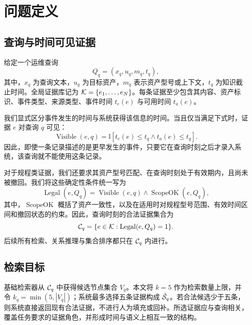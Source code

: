 \section{问题定义}
\label{sec:problem}

\subsection{查询与时间可见证据}

给定一个运维查询
\begin{equation}
Q_q=(x_q,u_q,m_q,t_q),
\end{equation}
其中，$x_q$ 为查询文本，$u_q$ 为目标资产，$m_q$ 表示资产型号或上下文，$t_q$ 为知识截止时间。全局证据库记为 $\mathcal{K}=\{e_1,\ldots,e_N\}$。每条证据至少包含其内容、资产标识、事件类型、来源类型、事件时间 $t_e(e)$ 与可用时间 $t_a(e)$。

我们显式区分事件发生的时间与系统获得该信息的时间。当且仅当满足下式时，证据 $e$ 对查询 $q$ 可见：
\begin{equation}
\operatorname{Visible}(e,q)
=
\mathbb{I}\!\left[
t_e(e)\le t_q \land t_a(e)\le t_q
\right].
\label{eq:visible}
\end{equation}
因此，即使一条记录描述的是更早发生的事件，只要它在查询时刻之后才录入系统，该查询就不能使用这条记录。

对于规程类证据，我们还要求其资产型号匹配、在查询时刻处于有效期内，且尚未被撤回。我们将这些确定性条件统一写为
\begin{equation}
\operatorname{Legal}(e,Q_q)
=
\operatorname{Visible}(e,q)
\land
\operatorname{ScopeOK}(e,Q_q),
\label{eq:legal}
\end{equation}
其中，$\operatorname{ScopeOK}$ 概括了资产一致性，以及在适用时对规程型号范围、有效时间区间和撤回状态的约束。因此，查询时刻的合法证据集合为
\begin{equation}
\mathcal{C}_q
=
\{e\in\mathcal{K}:\operatorname{Legal}(e,Q_q)=1\}.
\label{eq:candidate}
\end{equation}
后续所有检索、关系推理与集合排序都只在 $\mathcal{C}_q$ 内进行。

\subsection{检索目标}

基础检索器从 $\mathcal{C}_q$ 中获得候选节点集合 $V_q$。本文将 $k=5$ 作为检索数量上限，并令 $k_q=\min(5,|V_q|)$；系统最多选择五条证据构成 $\hat{\mathcal{S}}_q$。若合法候选少于五条，则系统直接返回现有合法证据，不进行人为填充或回补。所选证据应与查询相关，覆盖任务要求的证据角色，并形成时间与语义上相互一致的结构。

